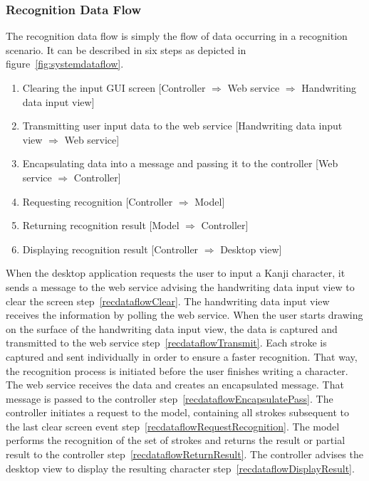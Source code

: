 \subsubsection{Recognition Data Flow}
\label{sec:arch:recognitiondataflow}

The recognition data flow is simply the flow of data occurring in a recognition 
scenario. It can be described in six %
steps as depicted in figure~\ref{fig:systemdataflow}.
\begin{enumerate}
  \item \label{recdataflowClear} 
        Clearing the input GUI screen 
        [Controller $\Rightarrow$ Web service $\Rightarrow$ Handwriting data input view]
  \item \label{recdataflowTransmit} 
        Transmitting user input data to the web service 
        [Handwriting data input view $\Rightarrow$ Web service]
  \item \label{recdataflowEncapsulatePass} 
        Encapsulating data into a message and passing 
        it to the controller 
        [Web service $\Rightarrow$ Controller]
  \item \label{recdataflowRequestRecognition} 
        Requesting recognition 
        [Controller $\Rightarrow$ Model] 
  \item \label{recdataflowReturnResult} 
        Returning recognition result 
        [Model $\Rightarrow$ Controller] 
  \item \label{recdataflowDisplayResult} %
        Displaying recognition result 
        [Controller $\Rightarrow$ Desktop view]
\end{enumerate}
When the desktop application requests the user to input a Kanji 
character, it sends a message to the web service advising the handwriting data 
input view to clear the screen step~\ref{recdataflowClear}. 
The handwriting data input view receives the information by polling the web 
service. 
When the user starts drawing on the surface of the handwriting data input view, 
the data is captured and transmitted to the web service 
step~\ref{recdataflowTransmit}.
Each stroke is captured and sent individually in order to ensure a faster 
recognition. That way, the recognition process is initiated before the
user finishes writing a character. The web service receives the data and 
creates an encapsulated message. That message is passed to the 
controller step~\ref{recdataflowEncapsulatePass}.
The controller initiates a request to the model, containing all strokes
subsequent to the last clear screen 
event step~\ref{recdataflowRequestRecognition}.
The model performs the recognition of the set of strokes and returns the result
or partial result to the controller step~\ref{recdataflowReturnResult}.
The controller advises the desktop view to display the resulting character
step~\ref{recdataflowDisplayResult}.

